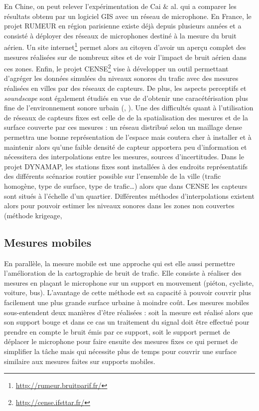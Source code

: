 En Chine, on peut relever l'expérimentation de Cai $\&$ al. \cite{cai_road_2014}  qui a comparer les résultats obtenu par un logiciel GIS avec un réseau de microphone. 
En France, le projet RUMEUR \cite{mietlicki2012innovative} en région parisienne existe déjà depuis plusieurs années et a consisté à déployer des réseaux de microphones destiné à la mesure du bruit aérien. Un site internet\footnote{\url{http://rumeur.bruitparif.fr/}} permet alors au citoyen d'avoir un aperçu complet des mesures réalisées sur de nombreux sites et de voir l'impact de bruit aérien dans ces zones. Enfin, le projet CENSE\footnote{\url{http://cense.ifsttar.fr/}} vise à développer un outil permettant d'agréger les données simulées du niveaux sonores du trafic avec des mesures réalisées en villes par des réseaux de capteurs. De plus, les aspects perceptifs et \textit{soundscape} sont également étudiés en vue de d'obtenir une caracétérisation plus fine de l'environnement sonore urbain (\cite{can_describing_2015}, \cite{brocolini_measurements_2013}). Une des difficultés quant à l'utilisation de réseaux de capteurs fixes est celle de de la spatialisation des mesures et de la surface couverte par ces mesures : un réseau distribué selon un maillage dense permettra une bonne représentation de l'espace mais coutera cher à installer et à maintenir alors qu'une faible densité de capteur apportera peu d'information et nécessitera des interpolations entre les mesures, sources d'incertitudes. Dans le projet DYNAMAP, les stations fixes sont installées à des endroits représentatifs des différents scénarios routier possible sur l'ensemble de la ville (trafic homogène, type de surface, type de trafic\dots) alors que dans CENSE les capteurs sont situés à l'échelle d'un quartier. Différentes méthodes d'interpolations existent alors pour pouvoir estimer les niveaux sonores dans les zones non couvertes (méthode krigeage,  \\

\subsection{Mesures mobiles}
En parallèle, la mesure mobile est une approche qui est elle aussi permettre l'amélioration de la cartographie de bruit de trafic. Elle consiste à réaliser des mesures en plaçant le microphone sur un support en mouvement (piéton, cycliste, voiture, bus). L'avantage de cette méthode est sa capacité à pouvoir couvrir plus facilement une plus grande surface urbaine à moindre coût. Les mesures mobiles sous-entendent deux manières d'être réalisées : soit la mesure est réalisé alors que son support bouge \cite{alsina-pages_design_2016} et dans ce cas un traitement du signal doit être effectué pour prendre en compte le bruit émis par ce support, soit le support permet de déplacer le microphone pour faire ensuite des mesures fixes \cite{manvell_sadman_2004} ce qui permet de simplifier la tâche mais qui nécessite plus de temps pour couvrir une surface similaire aux mesures faites sur supports mobiles. 

